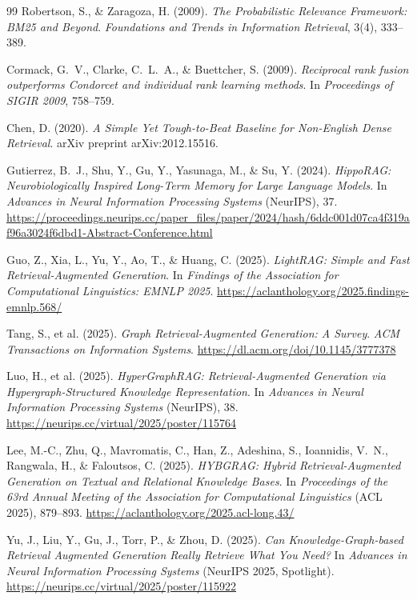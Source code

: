 \documentclass[12pt,a4paper]{report}
\theoremstyle{plain}
\theoremstyle{definition}
\begin{document}
\begin{thebibliography}{99}
		Robertson, S., \& Zaragoza, H. (2009).
		\textit{The Probabilistic Relevance Framework: BM25 and Beyond}.
		\textit{Foundations and Trends in Information Retrieval}, 3(4), 333--389.
		
		Cormack, G.~V., Clarke, C.~L.~A., \& Buettcher, S. (2009).
		\textit{Reciprocal rank fusion outperforms Condorcet and individual rank learning methods}.
		In \textit{Proceedings of SIGIR 2009}, 758--759.
		
		Chen, D. (2020).
		\textit{A Simple Yet Tough-to-Beat Baseline for Non-English Dense Retrieval}.
		arXiv preprint arXiv:2012.15516.
		
		Gutierrez, B.~J., Shu, Y., Gu, Y., Yasunaga, M., \& Su, Y. (2024).
		\textit{HippoRAG: Neurobiologically Inspired Long-Term Memory for Large Language Models}.
		In \textit{Advances in Neural Information Processing Systems} (NeurIPS), 37.
		\url{https://proceedings.neurips.cc/paper_files/paper/2024/hash/6ddc001d07ca4f319af96a3024f6dbd1-Abstract-Conference.html}

		Guo, Z., Xia, L., Yu, Y., Ao, T., \& Huang, C. (2025).
		\textit{LightRAG: Simple and Fast Retrieval-Augmented Generation}.
		In \textit{Findings of the Association for Computational Linguistics: EMNLP 2025}.
		\url{https://aclanthology.org/2025.findings-emnlp.568/}

		Tang, S., et al. (2025).
		\textit{Graph Retrieval-Augmented Generation: A Survey}.
		\textit{ACM Transactions on Information Systems}.
		\url{https://dl.acm.org/doi/10.1145/3777378}

		Luo, H., et al. (2025).
		\textit{HyperGraphRAG: Retrieval-Augmented Generation via Hypergraph-Structured Knowledge Representation}.
		In \textit{Advances in Neural Information Processing Systems} (NeurIPS), 38.
		\url{https://neurips.cc/virtual/2025/poster/115764}

		Lee, M.-C., Zhu, Q., Mavromatis, C., Han, Z., Adeshina, S., Ioannidis, V.~N.,
		Rangwala, H., \& Faloutsos, C. (2025).
		\textit{HYBGRAG: Hybrid Retrieval-Augmented Generation on Textual and Relational Knowledge Bases}.
		In \textit{Proceedings of the 63rd Annual Meeting of the Association for Computational Linguistics}
		(ACL 2025), 879--893.
		\url{https://aclanthology.org/2025.acl-long.43/}

		Yu, J., Liu, Y., Gu, J., Torr, P., \& Zhou, D. (2025).
		\textit{Can Knowledge-Graph-based Retrieval Augmented Generation Really Retrieve What You Need?}
		In \textit{Advances in Neural Information Processing Systems} (NeurIPS 2025, Spotlight).
		\url{https://neurips.cc/virtual/2025/poster/115922}


\end{thebibliography}
\end{document}
